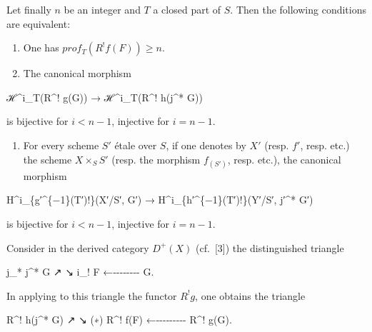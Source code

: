 \documentclass[
  11pt,
  a4paper,
]{book}
\newenvironment{Shaded}{}{}
\newcommand{\NormalTok}[1]{#1}
\providecommand{\tightlist}{%
  \setlength{\itemsep}{0pt}\setlength{\parskip}{0pt}}
\begin{document}
Let finally \(n\) be an integer and \(T\) a closed part of \(S\). Then
the following conditions are equivalent:

\begin{enumerate}
\def\labelenumi{(\roman{enumi})}
\item
  One has \(prof_{T}(R^{!} f(F)) \geqslant n\).
\item
  The canonical morphism
\end{enumerate}

\begin{Shaded}
\begin{Highlighting}[]
\NormalTok{ℋ\^{}i\_T(R\^{}! g(G)) → ℋ\^{}i\_T(R\^{}! h(j\^{}* G))}
\end{Highlighting}
\end{Shaded}

is bijective for \(i < n - 1\), injective for \(i = n - 1\).

\begin{enumerate}
\def\labelenumi{(\roman{enumi})}
\setcounter{enumi}{2}
\tightlist
\item
  For every scheme \(S'\) étale over \(S\), if one denotes by \(X'\)
  (resp. \(f'\), resp. etc.) the scheme \(X \times_{S} S'\) (resp. the
  morphism \(f_{(S')}\), resp. etc.), the canonical morphism
\end{enumerate}

\begin{Shaded}
\begin{Highlighting}[]
\NormalTok{H\^{}i\_\{g′\^{}\{−1\}(T′)!\}(X′/S′, G′) → H\^{}i\_\{h′\^{}\{−1\}(T′)!\}(Y′/S′, j′\^{}* G′)}
\end{Highlighting}
\end{Shaded}

is bijective for \(i < n - 1\), injective for \(i = n - 1\).

Consider in the derived category \(D^{+}(X)\) (cf.~{[}3{]}) the
distinguished triangle

\begin{Shaded}
\begin{Highlighting}[]
\NormalTok{        j\_* j\^{}* G}
\NormalTok{       ↗      ↘}
\NormalTok{   i\_! F ←{-}{-}{-}{-}{-}{-}{-}{-} G.}
\end{Highlighting}
\end{Shaded}

In applying to this triangle the functor \(R^{!} g\), one obtains the
triangle

\begin{Shaded}
\begin{Highlighting}[]
\NormalTok{              R\^{}! h(j\^{}* G)}
\NormalTok{             ↗            ↘}
\NormalTok{(∗)    R\^{}! f(F) ←{-}{-}{-}{-}{-}{-}{-}{-}{-} R\^{}! g(G).}
\end{Highlighting}
\end{Shaded}
\end{document}
